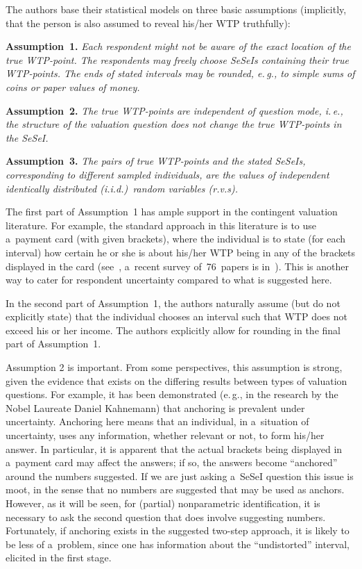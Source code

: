 \begin{multicols}{2}
\noindent
The authors base their statistical models on three basic assumptions 
(implicitly, that the person is also assumed to reveal his/her WTP truthfully):

\smallskip

\noindent
\textbf{Assumption~1.} \textit{Each respondent might not be aware of the exact location of the
true WTP-point. The respondents may freely choose SeSeIs
containing their true WTP-points. The ends of stated intervals may
be rounded, e.\,g., to simple sums of coins or paper values of money.}

\smallskip

\noindent
\textbf{Assumption~2.}
\textit{The true WTP-points are independent of question mode, i.\,e., the
structure of the valuation question does not change the true WTP-points in the
SeSeI.}


\smallskip

\noindent
\textbf{Assumption~3.}
\textit{The pairs of true WTP-points and the stated SeSeIs, corresponding to different sampled
individuals, are the values of independent identically distributed
(i.i.d.)\ random variables (r.v.s).}


The first part of Assumption~1 has ample support in the contingent
valuation literature. For example, the standard approach in this literature is to use a~payment
card (with given brackets), where the individual is to state (for each interval) how certain he
or she is about his/her WTP being in any of the brackets displayed in the card 
(see~\cite{BK:BB08},
a~recent survey of~76~papers is in~\cite{BK:MRKB14}). This is another way to
cater for respondent uncertainty compared to what is suggested here.

 In the second part of Assumption~1, the authors naturally assume (but
do not explicitly state) that the individual chooses an interval
such that WTP does not exceed his or her income. The authors explicitly
allow for rounding in the final part of Assumption~1.

 Assumption 2 is important. From some perspectives,
this assumption is strong, given the evidence that exists on
the differing results between types of valuation questions. 
For example, it has been demonstrated
(e.\,g., in the research by the Nobel Laureate Daniel Kahnemann) that anchoring is prevalent under uncertainty.
Anchoring here means that an individual, in a~situation of uncertainty, uses any information, whether
relevant or not, to form his/her answer. In particular, it is apparent that the actual brackets
being displayed in a~payment card may affect the answers; if so, the answers become ``anchored'' around
the numbers suggested. If we are just asking a~SeSeI question this issue is moot, in the sense that no
numbers are suggested that may be used as anchors. However, as it will be seen, for (partial) nonparametric
identification, it is necessary to ask the second question that does involve suggesting numbers. Fortunately,
if anchoring exists in the suggested two-step approach, it is likely to be less of a~problem, since 
one has
information about the ``undistorted'' interval, elicited in the first stage.


\end{multicols}
